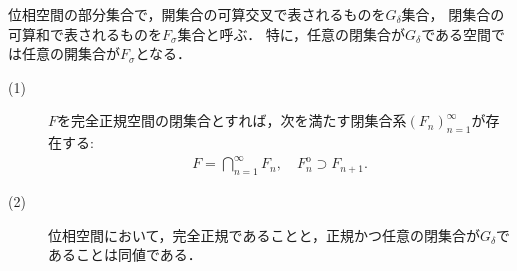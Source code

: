 	\begin{screen}
		\begin{dfn}
			位相空間の部分集合で，開集合の可算交叉で表されるものを$G_\delta$集合，
			閉集合の可算和で表されるものを$F_\sigma$集合と呼ぶ．
			特に，任意の閉集合が$G_\delta$である空間では任意の開集合が$F_\sigma$となる．
		\end{dfn}
	\end{screen}
	
	\begin{screen}
		\begin{thm}
		\label{thm:perfectly_normal_Hausdorff_is_normal_and_closed_is_G_delta}\mbox{}
			\begin{description}
				\item[(1)]
					$F$を完全正規空間の閉集合とすれば，次を満たす閉集合系$(F_n)_{n=1}^\infty$が存在する:
					\begin{align}
						F = \bigcap_{n=1}^\infty F_n,
						\quad F_n^{\mathrm{o}} \supset F_{n+1}. 
					\end{align}
					
				\item[(2)]
					位相空間において，完全正規であることと，正規かつ任意の閉集合が$G_\delta$であることは同値である．
			\end{description}
		\end{thm}
	\end{screen}
	
